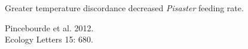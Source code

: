 \documentclass[t]{beamer}
\begin{document}
%
{
\begin{frame}[b]{Greater temperature discordance decreased \textit{Pisaster} feeding rate.}

\tiny Pincebourde et al. 2012.\\
\tiny Ecology Letters 15: 680.
\end{frame}
}

%
\end{document}
